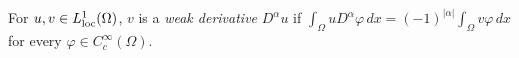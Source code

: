 
For $u,v\in L^1_{\rm loc}(\Omega)$, $v$ is a \emph{weak derivative} $D^\alpha u$ if $\int_\Omega uD^\alpha\varphi\,dx=(-1)^{|\alpha|}\int_\Omega v\varphi\,dx$ for every $\varphi\in C_c^\infty(\Omega)$.
